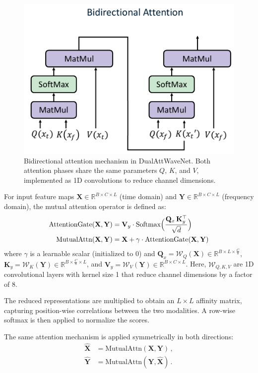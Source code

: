\documentclass[conference]{IEEEtran}
\begin{document}
\begin{figure}[htbp]
    \centering
    \includegraphics[width=0.65\linewidth]{bidirectional-attention.pdf}
    \caption{Bidirectional attention mechanism in DualAttWaveNet. Both attention phases share the same parameters $Q$, $K$, and $V$, implemented as 1D convolutions to reduce channel dimensions.}
    \label{fig:bidirectional-attention}
\end{figure}

For input feature maps $\mathbf{X} \in \mathbb{R}^{B \times C \times L}$ (time domain) and $\mathbf{Y} \in \mathbb{R}^{B \times C \times L}$ (frequency domain), the mutual attention operator is defined as:
\begin{equation}
    \begin{aligned}
        \text{AttentionGate}(\mathbf{X}, \mathbf{Y}) & = \mathbf{V}_y \cdot \text{Softmax}\Bigl(\frac{\mathbf{Q}_x\, \mathbf{K}_y^\top}{\sqrt{d}}\Bigr) \\
        \text{MutualAttn}(\mathbf{X}, \mathbf{Y})    & = \mathbf{X} + \gamma \cdot \text{AttentionGate}(\mathbf{X}, \mathbf{Y})
    \end{aligned}
\end{equation}
where $\gamma$ is a learnable scalar (initialized to 0) and $\mathbf{Q}_x = \mathcal{W}_Q(\mathbf{X}) \in \mathbb{R}^{B \times L \times \frac{C}{8}}$, $\mathbf{K}_y = \mathcal{W}_K(\mathbf{Y}) \in \mathbb{R}^{B \times \frac{C}{8} \times L}$, and $\mathbf{V}_y = \mathcal{W}_V(\mathbf{Y}) \in \mathbb{R}^{B \times C \times L}$. Here, $\mathcal{W}_{Q,K,V}$ are 1D convolutional layers with kernel size 1 that reduce channel dimensions by a factor of 8.

The reduced representations are multiplied to obtain an $L \times L$ affinity matrix, capturing position-wise correlations between the two modalities. A row-wise softmax is then applied to normalize the scores.

The same attention mechanism is applied symmetrically in both directions:
\begin{equation}
    \begin{aligned}
        \widehat{\mathbf{X}} & = \text{MutualAttn}(\mathbf{X}, \mathbf{Y})\,,           \\
        \widehat{\mathbf{Y}} & = \text{MutualAttn}(\mathbf{Y}, \widehat{\mathbf{X}})\,.
    \end{aligned}
\end{equation}
\end{document}
